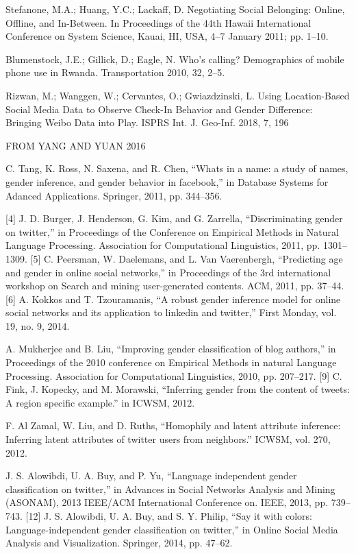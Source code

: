 \documentclass{article}
\begin{document}
Stefanone, M.A.; Huang, Y.C.; Lackaff, D. Negotiating Social Belonging: Online, Offline, and In-Between. In Proceedings of the 44th Hawaii International Conference on System Science, Kauai, HI, USA, 4–7 January 2011; pp. 1–10.

Blumenstock, J.E.; Gillick, D.; Eagle, N. Who’s calling? Demographics of mobile phone use in Rwanda. Transportation 2010, 32, 2–5.

Rizwan, M.; Wanggen, W.; Cervantes, O.; Gwiazdzinski, L. Using Location-Based Social Media Data to Observe Check-In Behavior and Gender Difference: Bringing Weibo Data into Play. ISPRS Int. J. Geo-Inf. 2018, 7, 196

FROM YANG AND YUAN 2016

C. Tang, K. Ross, N. Saxena, and R. Chen, “Whats in a name: a study of names, gender inference, and gender behavior in facebook,” in Database Systems for Adanced Applications. Springer, 2011, pp. 344–356.

[4] J. D. Burger, J. Henderson, G. Kim, and G. Zarrella, “Discriminating gender on twitter,” in Proceedings of the Conference on Empirical Methods in Natural Language Processing. Association for Computational Linguistics, 2011, pp. 1301–1309. [5] C. Peersman, W. Daelemans, and L. Van Vaerenbergh, “Predicting age and gender in online social networks,” in Proceedings of the 3rd international workshop on Search and mining user-generated contents. ACM, 2011, pp. 37–44. [6] A. Kokkos and T. Tzouramanis, “A robust gender inference model for online social networks and its application to linkedin and twitter,” First Monday, vol. 19, no. 9, 2014.

A. Mukherjee and B. Liu, “Improving gender classification of blog authors,” in Proceedings of the 2010 conference on Empirical Methods in natural Language Processing. Association for Computational Linguistics, 2010, pp. 207–217. [9] C. Fink, J. Kopecky, and M. Morawski, “Inferring gender from the content of tweets: A region specific example.” in ICWSM, 2012.

F. Al Zamal, W. Liu, and D. Ruths, “Homophily and latent attribute inference: Inferring latent attributes of twitter users from neighbors.” ICWSM, vol. 270, 2012.

J. S. Alowibdi, U. A. Buy, and P. Yu, “Language independent gender classification on twitter,” in Advances in Social Networks Analysis and Mining (ASONAM), 2013 IEEE/ACM International Conference on. IEEE, 2013, pp. 739–743. [12] J. S. Alowibdi, U. A. Buy, and S. Y. Philip, “Say it with colors: Language-independent gender classification on twitter,” in Online Social Media Analysis and Visualization. Springer, 2014, pp. 47–62.
\end{document}
